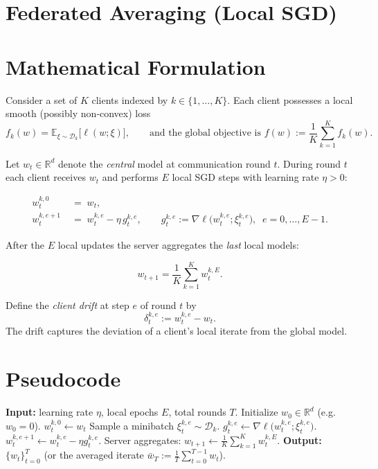 \documentclass{article}
\newcommand{\E}{\mathbb{E}}
\newcommand{\R}{\mathbb{R}}
\begin{document}
\section*{Federated Averaging (Local SGD) }

\section*{Mathematical Formulation}
Consider a set of $K$ clients indexed by $k\in\{1,\dots,K\}$.  
Each client possesses a local smooth (possibly non‑convex) loss
\[
f_k(w)=\E_{\xi\sim\mathcal{D}_k}\big[\ell(w;\xi)\big],\qquad 
\text{and the global objective is } 
f(w):=\frac1K\sum_{k=1}^{K}f_k(w).
\]

Let $w_t\in\R^d$ denote the \emph{central} model at communication round $t$.
During round $t$ each client receives $w_t$ and performs $E$ local SGD steps
with learning rate $\eta>0$:

\[
\boxed{
\begin{aligned}
w_{t}^{k,0}&\;=\;w_t,\\[2mm]
w_{t}^{k,e+1}&\;=\;w_{t}^{k,e}-\eta\, g_{t}^{k,e},\qquad 
g_{t}^{k,e}:=\nabla\ell\!\big(w_{t}^{k,e};\xi_{t}^{k,e}\big),\;\;e=0,\dots,E-1 .
\end{aligned}}
\]

After the $E$ local updates the server aggregates the \emph{last} local models:

\[
\boxed{ w_{t+1}= \frac1K\sum_{k=1}^{K} w_{t}^{k,E}. }
\]

Define the \emph{client drift} at step $e$ of round $t$ by
\[
\delta_{t}^{k,e}:= w_{t}^{k,e}- w_t .
\]
The drift captures the deviation of a client’s local iterate from the
global model.

\section*{Pseudocode}
\begin{algorithm}[H]
\caption{Federated Averaging (Local SGD)}\label{alg:fedavg}
\begin{algorithmic}[1]
\STATE \textbf{Input:} learning rate $\eta$, local epochs $E$, total rounds $T$.
\STATE Initialize $w_0\in\R^d$ (e.g. $w_0=0$).
        \STATE $w_{t}^{k,0}\leftarrow w_t$
            \STATE Sample a minibatch $\xi_{t}^{k,e}\sim\mathcal{D}_k$.
            \STATE $g_{t}^{k,e}\leftarrow\nabla\ell\!\big(w_{t}^{k,e};\xi_{t}^{k,e}\big)$.
            \STATE $w_{t}^{k,e+1}\leftarrow w_{t}^{k,e}-\eta g_{t}^{k,e}$.
        \ENDFOR
    \ENDFOR
    \STATE Server aggregates: $w_{t+1}\leftarrow \frac1K\sum_{k=1}^{K} w_{t}^{k,E}$.
\ENDFOR
\STATE \textbf{Output:} $\{w_t\}_{t=0}^{T}$ (or the averaged iterate $\bar w_T:=\frac1T\sum_{t=0}^{T-1}w_t$).
\end{algorithmic}
\end{algorithm}
\end{document}
